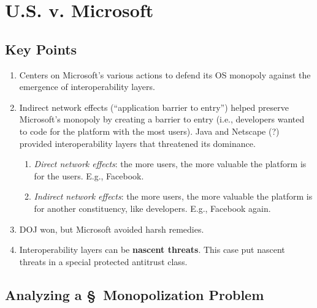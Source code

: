 \section{U.S. v. Microsoft}


\subsection{Key Points}

\begin{enumerate}
    \item Centers on Microsoft's various actions to defend its OS monopoly 
    against the emergence of interoperability layers.
    \item Indirect network effects (``application barrier to entry'') helped 
    preserve Microsoft's monopoly by creating a barrier to entry (i.e., 
    developers wanted to code for the platform with the most users). Java and 
    Netscape (?) provided interoperability layers that threatened its 
    dominance.
    \begin{enumerate}
        \item \emph{Direct network effects}: the more users, the more valuable 
        the platform is for the users. E.g., Facebook.
        \item \emph{Indirect network effects}: the more users, the more 
        valuable the platform is for another constituency, like developers. 
        E.g., Facebook again.
    \end{enumerate}
    \item DOJ won, but Microsoft avoided harsh remedies.
    \item Interoperability layers can be \textbf{nascent threats}. This case 
    put nascent threats in a special protected antitrust class.
\end{enumerate}

\subsection{Analyzing a \S\ Monopolization Problem}

